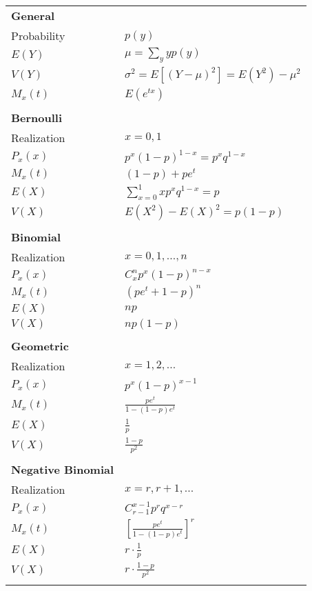 \documentclass[12pt]{article}
\newcommand{\bbb}[1]{\left[#1\right]}
\begin{document}
\begin{tabularx}{\textwidth}{X | X}
	\textbf{General} \\
	Probability & $p(y)$ \\
	$E(Y)$ & $\mu = \sum_y yp(y)$ \\
	$V(Y)$ & $\sigma^2 = E \bbb{(Y - \mu)^2} = E(Y^2) - \mu^2$ \\
	$M_x(t)$ & $E(e^{tx})$ \\\\
	\textbf{Bernoulli} \\
	Realization & $x = 0, 1$ \\
	$P_x(x)$ & $p^x(1-p)^{1-x} = p^x q^{1-x}$ \\
	$M_x(t)$ & $(1 - p) + pe^t$ \\
	$E(X)$ & $\sum_{x = 0}^1 x p^x q^{1-x} = p$ \\
	$V(X)$ & $E(X^2) - E(X)^2 = p(1 - p)$ \\\\
	\textbf{Binomial} \\
	Realization & $x = 0, 1, ..., n$ \\
	$P_x(x)$ & $C_x^n p^x (1-p)^{n - x}$ \\
	$M_x(t)$ & $(pe^t + 1 - p)^n$ \\
	$E(X)$ & $np$ \\
	$V(X)$ & $np(1 - p)$ \\\\
	\textbf{Geometric} \\
	Realization & $x = 1, 2, ...$ \\
	$P_x(x)$ & $p^x (1-p)^{x - 1}$ \\
	$M_x(t)$ & $\frac{pe^t}{1 - (1 - p)e^t}$ \\
	$E(X)$ & $\frac{1}{p}$ \\
	$V(X)$ & $\frac{1 - p}{p^2}$ \\\\
	\textbf{Negative Binomial} \\
	Realization & $x = r, r + 1, ...$ \\
	$P_x(x)$ & $C_{r - 1}^{x - 1} p^r q^{x - r}$ \\
	$M_x(t)$ & $\bbb{\frac{pe^t}{1 - (1 - p)e^t}}^r$ \\
	$E(X)$ & $r \cdot \frac{1}{p}$ \\
	$V(X)$ & $r \cdot \frac{1 - p}{p^2}$ \\\\
\end{tabularx}
\end{document}
